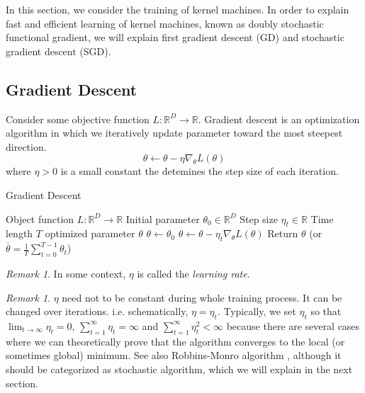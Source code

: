 \documentclass{amsart}
\theoremstyle{definition}
\theoremstyle{remark}
\newtheorem{remark}[theorem]{Remark}
\numberwithin{equation}{section}
\begin{document}
In this section, we consider the training of kernel machines.
In order to explain fast and efficient learning of kernel machines, known as doubly stochastic functional gradient, we will explain first gradient descent (GD) and stochastic gradient descent (SGD).


\subsection{Gradient Descent}

Consider some objective function $L:\mathbb{R}^D \to \mathbb{R}$.
Gradient descent is an optimization algorithm in which we iteratively update parameter
toward the most steepest direction.
\begin{equation}
\theta \leftarrow \theta - \eta \nabla_\theta L(\theta)
\end{equation}
where $\eta > 0$ is a small constant the detemines the step size of each iteration.

\begin{algorithm}
\caption{Gradient Descent}
\begin{algorithmic}
\REQUIRE Object function $L:\mathbb{R}^D \to \mathbb{R}$
\REQUIRE Initial parameter $\theta_0 \in \mathbb{R}^D$
\REQUIRE Step size $\eta_t \in \mathbb{R}$
\REQUIRE Time length $T$
\ENSURE optimized parameter $\theta$
\STATE $\theta \leftarrow \theta_0$
\STATE $\theta \leftarrow \theta - \eta_t \nabla_\theta L(\theta)$
\ENDFOR
\STATE Return $\theta$ (or $\overline{\theta} = \frac{1}{T}\sum_{t=0}^{T-1} \theta_{t}$)
\end{algorithmic}
\end{algorithm}

\begin{remark}
In some context, $\eta$ is called the \textit{learning rate}.
\end{remark}

\begin{remark}
$\eta$ need not to be constant during whole training process.
It can be changed over iterations. i.e. schematically, $\eta = \eta_t$.
Typically, we set $\eta_t$ so that $\lim_{t\to \infty}\eta_t = 0$, $\sum_{t=1}^{\infty} \eta_t = \infty$ and $\sum_{t=1}^{\infty} \eta_t^{2} < \infty$ because there are several cases where we can theoretically prove that the algorithm converges to the local (or sometimes global) minimum. See also Robbins-Monro algorithm \cite{robbins1951stochastic}, although it should be categorized as stochastic algorithm, which we will explain in the next section.
\end{remark}
\end{document}
